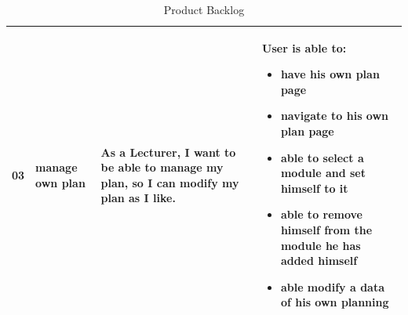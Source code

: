 \documentclass{scrartcl}
\begin{document}
\begin{table}[H]
\begin{center}
\begin{tabular}{|p{0.5cm} |p{3cm}|p{5.5cm}|p{5.5cm}|}

03&
manage own plan&

As a Lecturer, I want to be able to manage my plan, so I can modify my plan as I like. &

 User is able to:            
\begin{itemize}
\item have his own plan page
\item navigate to his own plan page
\item able to select a module and set himself to it
\item able to remove himself from the module he has added himself
\item able modify a data of his own planning 
\end{itemize}                                                                 \\ \hline







  \end{tabular}
\end{center}
\caption{Product Backlog}
\label{table2}
\end{table}

\pagebreak
\end{document}
